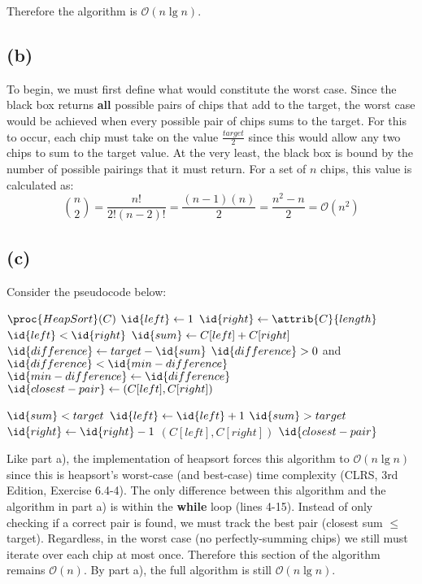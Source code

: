     Therefore the algorithm is $\mathcal{O}(n\lg{n})$.

    \subsection{(b)}
    To begin, we must first define what would constitute the worst case.
    Since the black box returns \textbf{all} possible pairs of chips that add to the target, the worst case would be achieved when every possible pair of chips sums to the target.
    For this to occur, each chip must take on the value $\frac{target}{2}$ since this would allow any two chips to sum to the target value.
    At the very least, the black box is bound by the number of possible pairings that it must return.
    For a set of $n$ chips, this value is calculated as:
    \[\binom{n}{2} = \frac{n!}{2!(n-2)!} = \frac{(n-1)(n)}{2} = \frac{n^2-n}{2} = \mathcal{O}(n^2)\]

    \subsection{(c)}
    Consider the pseudocode below:
    \begin{codebox}
        \li $\proc{HeapSort}(C)$
        \li $\id{left} \gets 1$
        \li $\id{right} \gets \attrib{C}{length}$
        \li \While $\id{left} < \id{right}$
            \Do
                \li $\id{sum} \gets C[left] + C[right]$
                \li $\id{difference} \gets target - \id{sum}$
                \li \If $\id{difference} > 0$ and $\id{difference} < \id{min-difference}$
                \Then
                    \li $\id{min-difference} \gets \id{difference}$
                    \li $\id{closest-pair} \gets (C[left], C[right])$
                \End

                \li \If $\id{sum} < target$
                \Then
                    \li $\id{left} \gets \id{left} + 1$
                \li \ElseIf $\id{sum} > target$
                \Then
                    \li $\id{right} \gets \id{right} - 1$
                \li \ElseNoIf
                    \li \Return $(C[left], C[right])$
                \End 
            \End
        \li \Return $\id{closest-pair}$
    \end{codebox}

    Like part a), the implementation of heapsort forces this algorithm to $\mathcal{O}(n\lg{n})$ since this is heapsort's worst-case (and best-case) time complexity (CLRS, 3rd Edition, Exercise 6.4-4).
    The only difference between this algorithm and the algorithm in part a) is within the \textbf{while} loop (lines 4-15).
    Instead of only checking if a correct pair is found, we must track the best pair (closest sum $\le$ target).
    Regardless, in the worst case (no perfectly-summing chips) we still must iterate over each chip at most once.
    Therefore this section of the algorithm remains $\mathcal{O}(n)$.
    By part a), the full algorithm is still $\mathcal{O}(n\lg{n})$.
